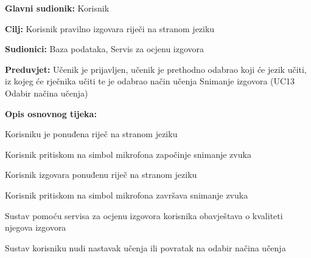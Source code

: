 \noindent {}
\begin{packed_item}

	\item \textbf{Glavni sudionik: } Korisnik
	\item \textbf{Cilj: } Korisnik pravilno izgovara riječi na stranom jeziku
	\item \textbf{Sudionici: } Baza podataka, Servis za ocjenu izgovora
	\item \textbf{Preduvjet: } Učenik je prijavljen, učenik je prethodno odabrao koji će jezik učiti, iz kojeg će rječnika učiti te je odabrao način učenja Snimanje izgovora (UC13 Odabir načina učenja)
	\item  \textbf{Opis osnovnog tijeka:} 
	
	\item[] \begin{packed_enum}

		\item Korisniku je ponuđena riječ na stranom jeziku
		\item Korisnik pritiskom na simbol mikrofona započinje snimanje zvuka
		\item Korisnik izgovara ponuđenu riječ na stranom jeziku
		\item Korisnik pritiskom na simbol mikrofona završava snimanje zvuka
		\item Sustav pomoću servisa za ocjenu izgovora korisnika obavještava o kvaliteti njegova izgovora
		\item Sustav korisniku nudi nastavak učenja ili povratak na odabir načina učenja

	\end{packed_enum}

\end{packed_item}





